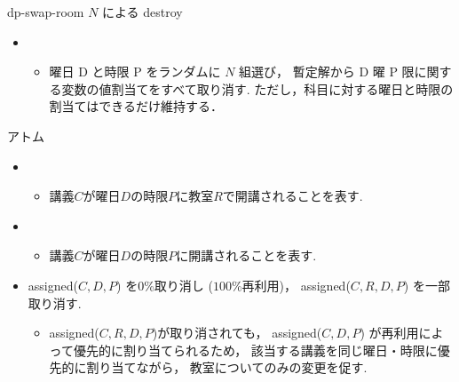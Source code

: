 \documentclass[11pt,dvipdfmx]{beamer}
\begin{document}
\begin{frame}{dp-swap-room $N$ による destroy}
 \begin{block}{}
 \begin{itemize}
  \item {}
   \begin{itemize}
    \item 曜日 D と時限 P をランダムに $N$ 組選び，
   暫定解から D 曜 P 限に関する変数の値割当てをすべて取り消す.
    ただし，科目に対する曜日と時限の割当てはできるだけ維持する．
   \end{itemize}
  \end{itemize}
 \end{block}
 \begin{exampleblock}{アトム}
  \begin{itemize}
   \item {}
   \begin{itemize}
    \item 講義$C$が曜日$D$の時限$P$に教室$R$で開講されることを表す.
   \end{itemize}
   \item {}
   \begin{itemize}
    \item 講義$C$が曜日$D$の時限$P$に開講されることを表す.
   \end{itemize}
  \end{itemize}
 \end{exampleblock}
 \begin{itemize}
  \item assigned($C,D,P$) を$0$\%取り消し ($100$\%再利用)，
  assigned($C,R,D,P$) を一部取り消す.
  \begin{itemize}
   \item assigned($C,R,D,P$)が取り消されても，
   assigned($C,D,P$) が再利用によって優先的に割り当てられるため，
   該当する講義を同じ曜日・時限に優先的に割り当てながら，
   教室についてのみの変更を促す.
  \end{itemize}
 \end{itemize}
\end{frame}
\end{document}
